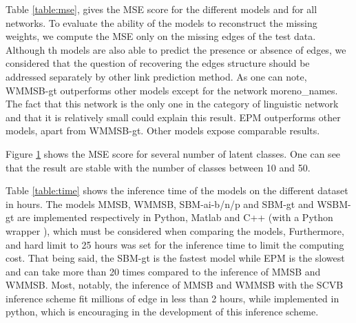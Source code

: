 
Table \ref{table:mse}, gives the MSE score for the different models and for all networks. To evaluate the ability of the models to reconstruct the missing weights, we compute the MSE only on the missing edges of the test data. Although th models are also able to predict the presence or absence of edges,  we considered that the question of recovering the edges structure should be addressed separately by other link prediction method. 
As one can note, WMMSB-gt outperforms other models except for the network moreno\_names. 
The fact that this network is the only one in the category of linguistic network and that it is relatively small could explain this result. EPM outperforms other models, apart from WMMSB-gt. Other models expose comparable results.

 

\begin{figure}[h]
\centering
	
   \label{fig:k_evolv}
\end{figure}

Figure \ref{fig:k_evolv} shows the MSE score for several number of latent classes. One can see that the result are stable with the number of classes between 10 and 50.

\begin{table*}[t]
\centering
	
\label{table:time}
\end{table*}

Table \ref{table:time} shows the inference time of the models on the different dataset in hours. The models MMSB, WMMSB, SBM-ai-b/n/p and SBM-gt and WSBM-gt are implemented respectively in Python, Matlab and C++ (with a Python wrapper \cite{peixoto_graph-tool_2014}), which must be considered when comparing the models, Furthermore, and hard limit to 25 hours was set for the inference time to limit the computing cost. That being said, the SBM-gt is the fastest model while EPM is the slowest and can take more than 20 times compared to the inference of MMSB and WMMSB. Most, notably, the inference of MMSB and WMMSB with the SCVB inference scheme fit millions of edge in less than 2 hours, while implemented in python, which is encouraging in the development of this inference scheme.


